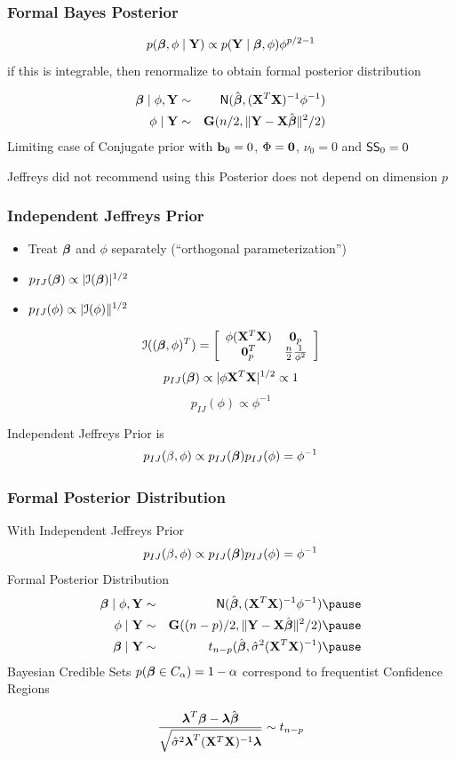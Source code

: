 \documentclass[handout]{beamer}
\begin{document}
\begin{frame}
  \frametitle{Formal Bayes Posterior}
$$  p(\boldsymbol{\beta}, \phi \mid \mathbf{Y}) \propto p(\mathbf{Y} \mid \boldsymbol{\beta}, \phi)  \phi^{p/2 - 1} $$
\pause
if this is integrable, then renormalize to obtain formal posterior
distribution \pause


\begin{eqnarray*}
  \boldsymbol{\beta} \mid \phi, \mathbf{Y} & \sim & \textsf{N}(\hat{\boldsymbol{\beta}}, (\mathbf{X}^T\mathbf{X})^{-1} \phi^{-1}) \\
  \phi \mid \mathbf{Y} & \sim& \mathbf{G}(n/2, \| \mathbf{Y} - \mathbf{X}\hat{\boldsymbol{\beta}} \|^2/2)
\end{eqnarray*} \pause
Limiting case of Conjugate prior with $\mathbf{b}_0 = 0$, $\Phi = \mathbf{0}$,
$\nu_0 = 0$ and $\textsf{SS}_0 = 0$ \pause

  \pause

\vfill
Jeffreys did not recommend using this Posterior does not depend on dimension $p$
\end{frame}
\begin{frame}
  \frametitle{Independent Jeffreys Prior}
  \begin{itemize}
  \item  Treat $\boldsymbol{\beta}$ and $\phi$ separately  (``orthogonal
    parameterization'') \pause
  \item $p_{IJ}(\boldsymbol{\beta}) \propto |{\cal{I}}(\boldsymbol{\beta})|^{1/2}$ \pause
\item $p_{IJ}(\phi) \propto |{\cal{I}}(\phi)\|^{1/2}$ \pause
  \end{itemize}
$$
{\cal{I}}((\boldsymbol{\beta}, \phi)^T)  =  \left[
  \begin{array}{cc}
    \phi (\mathbf{X}^T\mathbf{X}) & \mathbf{0}_p \\
  \mathbf{0}_p^T & \frac{n}{2} \frac{1}{\phi^2}
  \end{array}
\right]
$$
\pause
$$p_{IJ}(\boldsymbol{\beta}) \propto |\phi \mathbf{X}^T\mathbf{X}|^{1/2} \propto 1$$ \pause
$$p_{IJ}(\phi) \propto \phi^{-1}$$ \pause

Independent Jeffreys Prior is
$$p_{IJ}(\beta, \phi) \propto p_{IJ}(\boldsymbol{\beta}) p_{IJ}(\phi) = \phi^{-1}$$

\end{frame}
\begin{frame}
  \frametitle{Formal Posterior Distribution}
  With Independent Jeffreys Prior
$$p_{IJ}(\beta, \phi) \propto p_{IJ}(\boldsymbol{\beta}) p_{IJ}(\phi) = \phi^{-1}$$
\pause
Formal Posterior Distribution
\pause
\begin{eqnarray*}
  \b \mid \phi, \Y & \sim & \N(\bhat, (\X^T\X)^{-1} \phi^{-1}) \pause \\
  \phi \mid \Y & \sim& \G((n-p)/2, \| \Y - \X\bhat \|^2/2) \pause\\
\b \mid \Y & \sim & t_{n-p}(\bhat, \shat (\X^T\X)^{-1})\pause
\end{eqnarray*}
Bayesian Credible Sets
$p(\boldsymbol{\beta} \in C_\alpha) = 1- \alpha$ correspond to frequentist Confidence
Regions

$$\frac{\boldsymbol{\lambda}^T\boldsymbol{\beta} - \boldsymbol{\lambda}\hat{\boldsymbol{\beta}}}
{\sqrt{{\hat{\sigma}}^2 \boldsymbol{\lambda}^T(\mathbf{X}^T\mathbf{X})^{-1} \boldsymbol{\lambda}}} \sim t_{n-p}$$

\end{frame}
\end{document}
